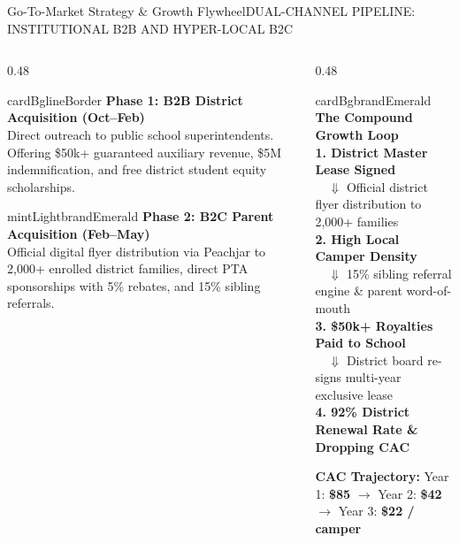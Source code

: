 \documentclass[aspectratio=169,9pt]{beamer}
\begin{document}
\begin{frame}{Go-To-Market Strategy \& Growth Flywheel}{DUAL-CHANNEL PIPELINE: INSTITUTIONAL B2B AND HYPER-LOCAL B2C}

\begin{columns}[T]
  \begin{column}{0.48\textwidth}
    \begin{execbox}{cardBg}{lineBorder}
      \textcolor{brandNavy}{\textbf{\scriptsize Phase 1: B2B District Acquisition (Oct--Feb)}} \\[1pt]
      \tiny Direct outreach to public school superintendents. Offering \$50k+ guaranteed auxiliary revenue, \$5M indemnification, and free district student equity scholarships.
    \end{execbox}

    \vskip2pt
    \begin{execbox}{mintLight}{brandEmerald}
      \textcolor{brandEmerald}{\textbf{\scriptsize Phase 2: B2C Parent Acquisition (Feb--May)}} \\[1pt]
      \tiny Official digital flyer distribution via Peachjar to 2,000+ enrolled district families, direct PTA sponsorships with 5\% rebates, and 15\% sibling referrals.
    \end{execbox}
  \end{column}

  \begin{column}{0.48\textwidth}
    \begin{execbox}{cardBg}{brandEmerald}
      \textcolor{brandEmerald}{\textbf{\scriptsize The Compound Growth Loop}} \\[2pt]
      \tiny
      \textbf{1. District Master Lease Signed} \\
      $\quad\Downarrow$ Official district flyer distribution to 2,000+ families \\
      \textbf{2. High Local Camper Density} \\
      $\quad\Downarrow$ 15\% sibling referral engine \& parent word-of-mouth \\
      \textbf{3. \$50k+ Royalties Paid to School} \\
      $\quad\Downarrow$ District board re-signs multi-year exclusive lease \\
      \textbf{4. 92\% District Renewal Rate \& Dropping CAC}
    \end{execbox}

    \vskip2pt
    \centering
    \tiny \textbf{CAC Trajectory:} Year 1: \textbf{\$85} $\rightarrow$ Year 2: \textbf{\$42} $\rightarrow$ Year 3: \textbf{\$22 / camper}
  \end{column}
\end{columns}

\end{frame}
\end{document}
